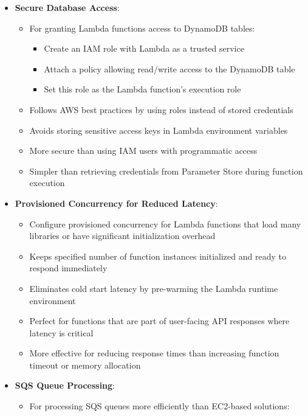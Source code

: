 \documentclass[11pt,a4paper]{report}
\begin{document}
\begin{itemize}
\begin{itemize}
  \item Automatically scales with the number of incoming files
  \item For cost-optimized storage, implement S3 Lifecycle rules to transition rarely accessed files to Glacier
\end{itemize}
  \item \textbf{Secure Database Access}:
\begin{itemize}
  \item For granting Lambda functions access to DynamoDB tables:
\begin{itemize}
  \item Create an IAM role with Lambda as a trusted service
  \item Attach a policy allowing read/write access to the DynamoDB table
  \item Set this role as the Lambda function's execution role
\end{itemize}
  \item Follows AWS best practices by using roles instead of stored credentials
  \item Avoids storing sensitive access keys in Lambda environment variables
  \item More secure than using IAM users with programmatic access
  \item Simpler than retrieving credentials from Parameter Store during function execution
\end{itemize}
  \item \textbf{Provisioned Concurrency for Reduced Latency}:
\begin{itemize}
  \item Configure provisioned concurrency for Lambda functions that load many libraries or have significant initialization overhead
  \item Keeps specified number of function instances initialized and ready to respond immediately
  \item Eliminates cold start latency by pre-warming the Lambda runtime environment
  \item Perfect for functions that are part of user-facing API responses where latency is critical
  \item More effective for reducing response times than increasing function timeout or memory allocation
\end{itemize}
  \item \textbf{SQS Queue Processing}:
\begin{itemize}
  \item For processing SQS queues more efficiently than EC2-based solutions:

\end{itemize}
\end{itemize}
\end{document}
